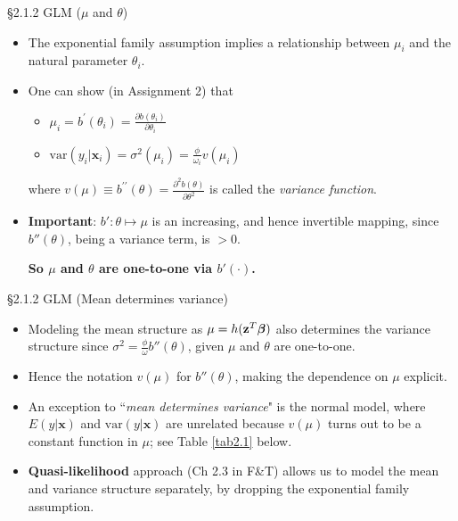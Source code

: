 \documentclass{beamer}
\newenvironment{wideitemize}%
  {\begin{itemize}%
    \setlength{\parskip}{1em}}%
  {\end{itemize}}
\begin{document}
\begin{frame}{\S2.1.2 GLM ($\mu$ and $\theta$)}
\noindent
\begin{wideitemize}
\item The exponential family assumption  implies  a relationship between $\mu_i$ and the natural parameter $\theta_i$.
\item One can  show (in Assignment 2) that
\begin{wideitemize}
\item $\mu_i=b^\prime (\theta_i)=\frac{\partial b(\theta_i)}{\partial \theta_i}$
\item $\mbox{var} (y_i|\textbf{x}_i)=\sigma^2(\mu_i)=\frac{\phi}{\omega_i} v(\mu_i)$
\end{wideitemize}
where
$v(\mu)\equiv b^{\prime\prime}(\theta)=\frac{\partial^2 b(\theta)}{\partial \theta^2}$ is called the 
\textit{variance function}.

\item  {\bf Important}: $b' : \theta \mapsto \mu $ is an increasing, and hence invertible mapping, since $b''(\theta)$, being a variance term, is $>0$. 

\begin{center} {\bf So $\mu$ and $\theta$ are one-to-one via $b'(\cdot)$. }

\end{center}

\end{wideitemize}
\end{frame}




\begin{frame}{\S2.1.2 GLM (Mean determines variance)}

\begin{wideitemize}

\item 
 Modeling the  mean structure  as $\mu=h(\textbf{z}^T\mbox{\boldmath $\beta$})$  also determines the variance structure
since $\sigma^2 = \frac{\phi}{\omega} b''(\theta)$, given $\mu$ and $\theta$ are one-to-one.

\item Hence the notation $v(\mu)$ for $b''(\theta)$, making the dependence on $\mu$ explicit.


\item An exception to ``\emph{mean determines variance}" is the normal model, where $E(y|\textbf{x})$ and 
$\mbox{var}(y|\textbf{x})$ are unrelated because $v(\mu)$ turns out to be a constant function in $\mu$; see Table \ref{tab2.1} below. 
\item \textbf{Quasi-likelihood} approach (Ch 2.3 in F\&T) allows us to model the mean and variance structure separately, by dropping the exponential family assumption.  

\end{wideitemize}

\end{frame}
\end{document}
